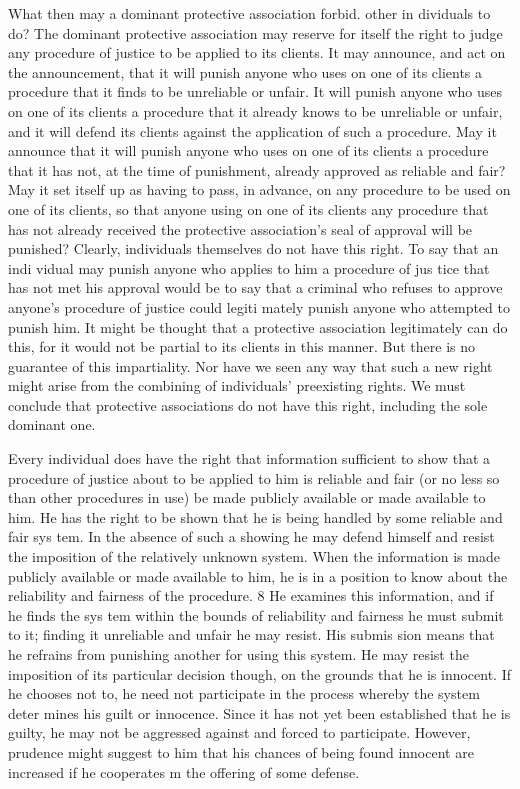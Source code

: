 \documentclass[11pt,openany]{book}
\begin{document}
What then may a dominant protective association forbid. other in dividuals to do? The dominant protective association may reserve for itself the right to judge any procedure of justice to be applied to its clients. It may announce, and act on the announcement, that it will punish anyone who uses on one of its clients a procedure that it finds to be unreliable or unfair. It will punish anyone who uses on one of its clients a procedure that it already knows to be unreliable or unfair, and it will defend its clients against the application of such a procedure. May it announce that it will punish anyone who uses on one of its clients a procedure that it has not, at the time of punishment, already approved as reliable and fair? May it set itself up as having to pass, in advance, on any procedure to be used on one of its clients, so that anyone using on one of its clients any procedure that has not already received the protective association's seal of approval will be punished? Clearly, individuals themselves do not have this right. To say that an indi vidual may punish anyone who applies to him a procedure of jus tice that has not met his approval would be to say that a criminal who refuses to approve anyone's procedure of justice could legiti mately punish anyone who attempted to punish him. It might be thought that a protective association legitimately can do this, for it would not be partial to its clients in this manner. But there is no guarantee of this impartiality. Nor have we seen any way that such a new right might arise from the combining of individuals' preexisting rights. We must conclude that protective associations do not have this right, including the sole dominant one. 

Every individual does have the right that information sufficient to show that a procedure of justice about to be applied to him is reliable and fair (or no less so than other procedures in use) be made publicly available or made available to him. He has the right to be shown that he is being handled by some reliable and fair sys tem. In the absence of such a showing he may defend himself and resist the imposition of the relatively unknown system. When the information is made publicly available or made available to him, he is in a position to know about the reliability and fairness of the procedure. 8 He examines this information, and if he finds the sys tem within the bounds of reliability and fairness he must submit to it; finding it unreliable and unfair he may resist. His submis sion means that he refrains from punishing another for using this system. He may resist the imposition of its particular decision though, on the grounds that he is innocent. If he chooses not to, he need not participate in the process whereby the system deter mines his guilt or innocence. Since it has not yet been established that he is guilty, he may not be aggressed against and forced to participate. However, prudence might suggest to him that his chances of being found innocent are increased if he cooperates m the offering of some defense. 
\end{document}
